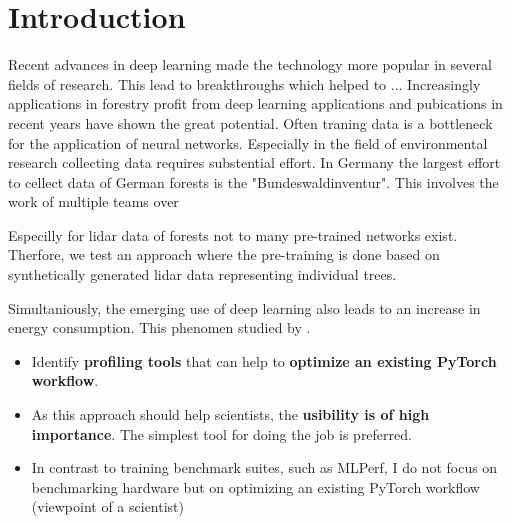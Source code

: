 \documentclass[12pt, a4paper, hidelinks]{article}
\begin{document}
\thispagestyle{plain}
\newpage


\setcounter{page}{1}
\pagestyle{fancy}


\section{Introduction}

Recent advances in deep learning made the technology more popular in several fields of research.
This lead to breakthroughs which helped to ...
Increasingly applications in forestry profit from deep learning applications and pubications in recent years have shown the great potential. Often traning data is a bottleneck for the application of neural networks. Especially in the field of environmental research collecting data requires substential effort. In Germany the largest effort to cellect data of German forests is the "Bundeswaldinventur". This involves the work of multiple teams over 

Especilly for lidar data of forests not to many pre-trained networks exist. Therfore, we test an approach where the pre-training is done based on synthetically generated lidar data representing individual trees.

Simultaniously, the emerging use of deep learning also leads to an increase in energy consumption. This phenomen studied by \cite{20220610_dodge_measuring-the-carbon-intensity-of-ai-in-cloud-instances}. 

\begin{itemize}
    \item Identify \textbf{profiling tools} that can help to \textbf{optimize an existing PyTorch workflow}.
    \item As this approach should help scientists, the \textbf{usibility is of high importance}. The simplest tool for doing the job is preferred.
    \item In contrast to training benchmark suites, such as MLPerf, I do not focus on benchmarking hardware but on optimizing an existing PyTorch workflow (viewpoint of a scientist)
\end{itemize}
\end{document}
